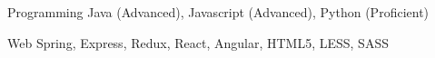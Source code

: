 

\begin{cvskills}

  \cvskill
    {Programming} %
    {Java (Advanced), Javascript (Advanced), Python (Proficient)} %

  \cvskill
    {Web} %
    {Spring, Express, Redux, React, Angular, HTML5, LESS, SASS} %

\end{cvskills}
